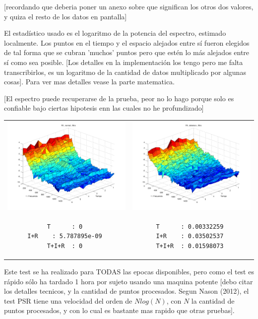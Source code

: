 [recordando que deberia poner un anexo sobre que significan los
otros dos valores, y quiza el resto de los datos en pantalla]

El estad\'istico usado es el logaritmo de la potencia del espectro, estimado localmente.
Los puntos en el tiempo y el espacio alejados entre s\'i fueron elegidos de tal forma que
se cubran 'muchos' puntos pero que est\'en lo m\'as alejados entre s\'i como sea posible.
[Los detalles en la implementaci\'on los tengo pero me falta transcribirlos, es un logaritmo
de la cantidad de datos multiplicado por algunas cosas]. Para ver mas detalles vease la parte matematica.

[El espectro puede recuperarse de la prueba, peor no lo hago porque solo
es confiable bajo ciertas hipotesis enn las cuales no he profundizado]

\begin{tabular}{cc}
\includegraphics[width=0.5\linewidth]{n8f.pdf} 
&
\includegraphics[width=0.5\linewidth]{d8f.pdf} 
\\
\begin{lstlisting}
T      : 0 
I+R    : 5.787895e-09 
T+I+R  : 0 
\end{lstlisting}
&
\begin{lstlisting}
T      : 0.00332259 
I+R    : 0.03502537 
T+I+R  : 0.01598073 
\end{lstlisting}
\end{tabular}

Este test se ha realizado para TODAS las epocas disponibles, pero como el test
es r\'apido s\'olo ha tardado 1 hora por sujeto usando una maquina potente [debo citar
los detalles tecnicos, y la cantidad de puntos procesados. Segun Nason (2012), el test PSR
tiene una velocidad del orden de $N log(N)$, con $N$ la cantidad de puntos procesados, y 
con lo cual es bastante mas rapido que otras pruebas].

